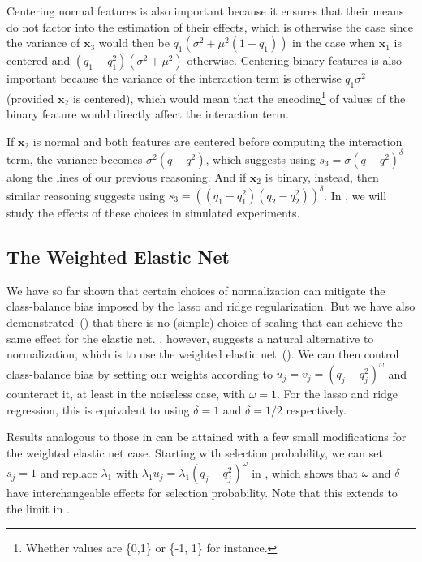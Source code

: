 Centering normal features is also important because it ensures that their means do not
factor into the estimation of their effects, which is otherwise the case since the variance
of \(\bm{x}_3\) would then be \(q_1(\sigma^2 + \mu^2(1 - q_1))\) in the case when
\(\bm{x}_1\) is centered and \((q_1 - q_1^2)(\sigma^2 + \mu^2)\) otherwise. Centering
binary features is also important because the variance of the interaction term is otherwise
\(q_1\sigma^2\) (provided \(\bm{x}_2\) is centered), which would mean that the
encoding\footnote{Whether values are \{0,1\} or \{-1, 1\} for instance.} of values of the
binary feature would directly affect the interaction term.

If \(\bm{x}_2\) is normal and both features are centered before computing the interaction
term, the variance becomes \(\sigma^2 (q-q^2)\), which suggests using \(s_3 = \sigma (q -
q^2)^\delta\) along the lines of our previous reasoning. And if \(\bm{x}_2\) is binary,
instead, then similar reasoning suggests using \(s_3 = ((q_1-q_1^2)(q_2-q_2^2))^\delta\).
In , we will study the effects of these choices in
simulated experiments.

\subsection{The Weighted Elastic Net}\label{sec:binary-weighting}

We have so far shown that certain choices of normalization can mitigate the class-balance
bias imposed by the lasso and ridge regularization. But we have also
demonstrated~() that there is no (simple) choice of
scaling that can achieve the same effect for the elastic net.
, however, suggests a natural alternative to normalization,
which is to use the weighted elastic net~(). We can then
control class-balance bias by setting our weights according to \(u_j = v_j = (q_j -
q_j^2)^{\omega}\) and counteract it, at least in the noiseless case, with \(\omega = 1\).
For the lasso and ridge regression, this is equivalent to using \(\delta = 1\) and \(\delta
= 1/2\) respectively.

Results analogous to those in  can be attained with a few
small modifications for the weighted elastic net case. Starting with selection probability,
we can set \(s_j = 1\) and replace \(\lambda_1\) with \(\lambda_1 u_j =
\lambda_1(q_j-q_j^2)^\omega\) in , which shows that
\(\omega\) and \(\delta\) have interchangeable effects for selection probability. Note that
this extends to the limit in .

